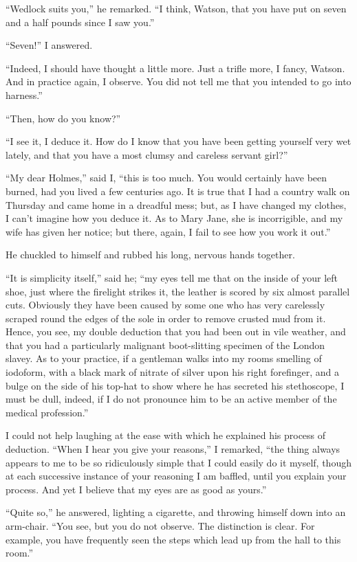 “Wedlock suits you,” he remarked. “I think, Watson, that
you have put on seven and a half pounds since I saw you.”

“Seven!” I answered.

“Indeed, I should have thought a little more. Just a trifle
more, I fancy, Watson. And in practice again, I observe.
You did not tell me that you intended to go into harness.”

“Then, how do you know?”

“I see it, I deduce it. How do I know that you have been
getting yourself very wet lately, and that you have a most
clumsy and careless servant girl?”

“My dear Holmes,” said I, “this is too much. You would
certainly have been burned, had you lived a few centuries ago.
It is true that I had a country walk on Thursday and came
home in a dreadful mess; but, as I have changed my clothes,
I can’t imagine how you deduce it. As to Mary Jane, she is
incorrigible, and my wife has given her notice; but there,
again, I fail to see how you work it out.”

He chuckled to himself and rubbed his long, nervous hands
together.

“It is simplicity itself,” said he; “my eyes tell me that on
the inside of your left shoe, just where the firelight strikes it,
the leather is scored by six almost parallel cuts. Obviously
they have been caused by some one who has very carelessly
scraped round the edges of the sole in order to remove
crusted mud from it. Hence, you see, my double deduction
that you had been out in vile weather, and that you had a
particularly malignant boot-slitting specimen of the London
slavey. As to your practice, if a gentleman walks into my
rooms smelling of iodoform, with a black mark of nitrate of
silver upon his right forefinger, and a bulge on the side of his
top-hat to show where he has secreted his stethoscope, I
must be dull, indeed, if I do not pronounce him to be an active
member of the medical profession.”

I could not help laughing at the ease with which he explained
his process of deduction. “When I hear you give
your reasons,” I remarked, “the thing always appears to me
to be so ridiculously simple that I could easily do it myself,
though at each successive instance of your reasoning I am
baffled, until you explain your process. And yet I believe
that my eyes are as good as yours.”

“Quite so,” he answered, lighting a cigarette, and throwing
himself down into an arm-chair. “You see, but you do not
observe. The distinction is clear. For example, you have frequently
seen the steps which lead up from the hall to this room.”


